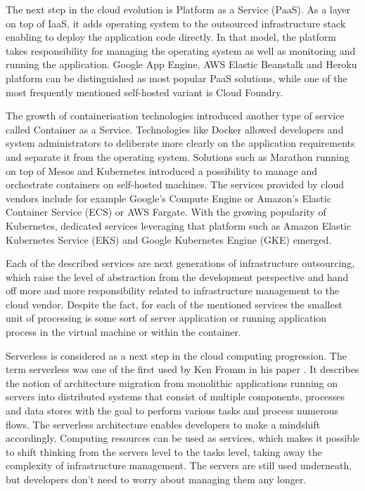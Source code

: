 The next step in the cloud evolution is Platform as a Service (PaaS). As a layer on top of IaaS, it adds operating system to the outsourced infrastructure stack enabling to deploy the application code directly. In that model, the platform takes responsibility for managing the operating system as well as monitoring and running the application. Google App Engine, AWS Elastic Beanstalk and Heroku platform can be distinguished as most popular PaaS solutions, while one of the most frequently mentioned self-hosted variant is Cloud Foundry.

The growth of containerisation technologies introduced another type of service called Container as a Service. Technologies like Docker allowed developers and system administrators to deliberate more clearly on the application requirements and separate it from the operating system. Solutions such as Marathon running on top of Mesos and Kubernetes introduced a possibility to manage and orchestrate containers on self-hosted machines. The services provided by cloud vendors include for example Google's Compute Engine or Amazon's Elastic Container Service (ECS) or AWS Fargate. With the growing popularity of Kubernetes, dedicated services leveraging that platform such as Amazon Elastic Kubernetes Service (EKS) and Google Kubernetes Engine (GKE) emerged.

Each of the described services are next generations of infrastructure outsourcing, which raise the level of abstraction from the development perspective and hand off more and more responsibility related to infrastructure management to the cloud vendor. Despite the fact, for each of the mentioned services the smallest unit of processing is some sort of server application or running application process in the virtual machine or within the container.

Serverless is considered as a next step in the cloud computing progression. The term serverless was one of the first used by Ken Fromm in his paper \cite{KenFromm}. It describes the notion of architecture migration from monolithic applications running on servers into distributed systems that consist of multiple components, processes and data stores with the goal to perform various tasks and process numerous flows. The serverless architecture enables developers to make a mindshift accordingly. Computing resources can be used as services, which makes it possible to shift thinking from the servers level to the tasks level, taking away the complexity of infrastructure management. The servers are still used underneath, but developers don't need to worry about managing them any longer.

